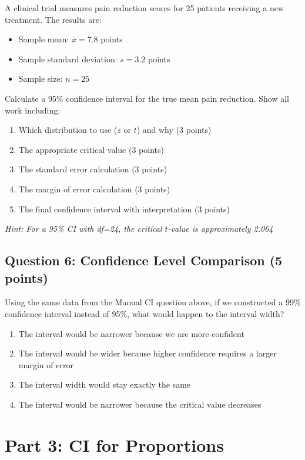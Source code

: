 \documentclass[11pt]{article}
\begin{document}
A clinical trial measures pain reduction scores for 25 patients receiving a new treatment. The results are:
\begin{itemize}
\item Sample mean: $\bar{x} = 7.8$ points
\item Sample standard deviation: $s = 3.2$ points
\item Sample size: $n = 25$
\end{itemize}

Calculate a 95\% confidence interval for the true mean pain reduction. Show all work including:
\begin{enumerate}[label=\alph*)]
\item Which distribution to use ($z$ or $t$) and why (3 points)
\item The appropriate critical value (3 points)
\item The standard error calculation (3 points)
\item The margin of error calculation (3 points)
\item The final confidence interval with interpretation (3 points)
\end{enumerate}

\textit{Hint: For a 95\% CI with df=24, the critical $t$-value is approximately 2.064}

\subsection*{Question 6: Confidence Level Comparison (5 points)}

Using the same data from the Manual CI question above, if we constructed a 99\% confidence interval instead of 95\%, what would happen to the interval width?

\begin{enumerate}[label=\alph*)]
\item The interval would be narrower because we are more confident
\item The interval would be wider because higher confidence requires a larger margin of error
\item The interval width would stay exactly the same
\item The interval would be narrower because the critical value decreases
\end{enumerate}

\section*{Part 3: CI for Proportions}
\end{document}
